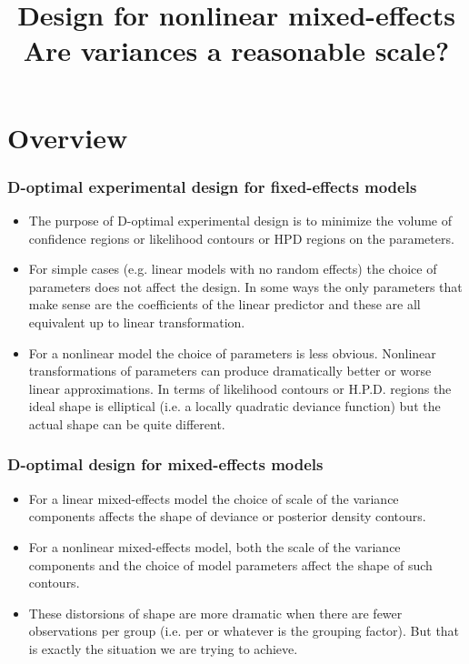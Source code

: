 \documentclass[dvipsnames,pdflatex,beamer]{beamer}
\title[Scales for D-optimal design]{Design for nonlinear mixed-effects\\Are variances a reasonable scale?}
\begin{document}

\section[Overview]{Overview}
\begin{frame}
  \frametitle{D-optimal experimental design for fixed-effects models}
  \begin{itemize}
  \item The purpose of D-optimal experimental design is to minimize
    the volume of confidence regions or likelihood contours or HPD
    regions on the parameters.
  \item For simple cases (e.g. linear models with no random effects)
    the choice of parameters does not affect the design.  In some ways
    the only parameters that make sense are the coefficients of the
    linear predictor and these are all equivalent up to linear
    transformation.
  \item For a nonlinear model the choice of parameters is less
    obvious.  Nonlinear transformations of parameters can produce
    dramatically better or worse linear approximations.  In terms of
    likelihood contours or H.P.D. regions the ideal shape is
    elliptical (i.e. a locally quadratic deviance function) but the
    actual shape can be quite different.
  \end{itemize}
\end{frame}
\begin{frame}
  \frametitle{D-optimal design for mixed-effects models}
  \begin{itemize}
  \item For a linear mixed-effects model the choice of scale of the
    variance components affects the shape of deviance or posterior
    density contours.
  \item For a nonlinear mixed-effects model, both the scale of the
    variance components and the choice of model parameters affect the
    shape of such contours.
  \item These distorsions of shape are more dramatic when there are
    fewer observations per group (i.e. per  or whatever
    is the grouping factor).  But that is exactly the situation we are
    trying to achieve.
  \end{itemize}
\end{frame}
\end{document}
